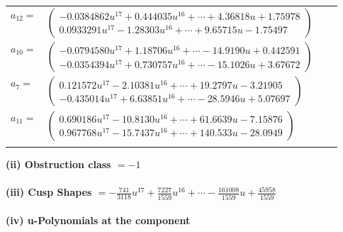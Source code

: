 \documentclass[1p]{elsarticle_modified}
\theoremstyle{definition}
\begin{document}
\begin{tabular}{m{7pt} m{180pt} m{7pt} m{180pt} }
\flushright $a_{12}=$&$\begin{pmatrix}-0.0384862 u^{17}+0.444035 u^{16}+\cdots+4.36818 u+1.75978\\0.0933291 u^{17}-1.28303 u^{16}+\cdots+9.65715 u-1.75497\end{pmatrix}$ \\
\flushright $a_{10}=$&$\begin{pmatrix}-0.0794580 u^{17}+1.18706 u^{16}+\cdots-14.9190 u+0.442591\\-0.0354394 u^{17}+0.730757 u^{16}+\cdots-15.1026 u+3.67672\end{pmatrix}$ \\
\flushright $a_{7}=$&$\begin{pmatrix}0.121572 u^{17}-2.10381 u^{16}+\cdots+19.2797 u-3.21905\\-0.435014 u^{17}+6.63851 u^{16}+\cdots-28.5946 u+5.07697\end{pmatrix}$ \\
\flushright $a_{11}=$&$\begin{pmatrix}0.690186 u^{17}-10.8130 u^{16}+\cdots+61.6639 u-7.15876\\0.967768 u^{17}-15.7437 u^{16}+\cdots+140.533 u-28.0949\end{pmatrix}$\\&\end{tabular}
\flushleft \textbf{(ii) Obstruction class $= -1$}\\~\\
\flushleft \textbf{(iii) Cusp Shapes $= -\frac{741}{3118} u^{17}+\frac{7227}{1559} u^{16}+\cdots-\frac{161008}{1559} u+\frac{45958}{1559}$}\\~\\
\newpage\renewcommand{\arraystretch}{1}
\flushleft \textbf{(iv) u-Polynomials at the component}\newline \\
\end{document}

